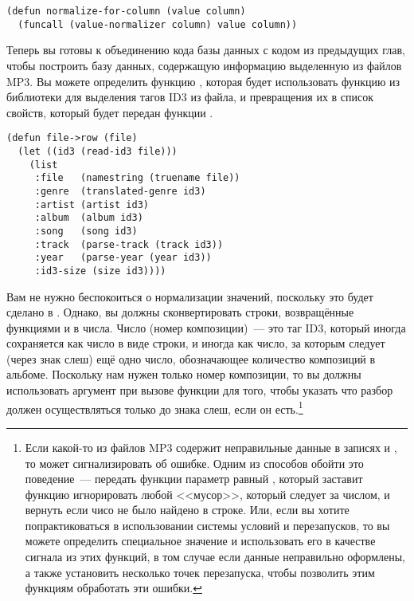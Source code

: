 \begin{lstlisting}
(defun normalize-for-column (value column)
  (funcall (value-normalizer column) value column))
\end{lstlisting}

Теперь вы готовы к объединению кода базы данных с кодом из предыдущих глав, чтобы
построить базу данных, содержащую информацию выделенную из файлов MP3.  Вы можете
определить функцию , которая будет использовать функцию  из
библиотеки  для выделения тагов ID3 из файла, и превращения их в список
свойств, который будет передан функции .

\begin{lstlisting}
(defun file->row (file)
  (let ((id3 (read-id3 file)))
    (list
     :file   (namestring (truename file))
     :genre  (translated-genre id3)
     :artist (artist id3)
     :album  (album id3)
     :song   (song id3)
     :track  (parse-track (track id3))
     :year   (parse-year (year id3))
     :id3-size (size id3))))
\end{lstlisting}

Вам не нужно беспокоиться о нормализации значений, поскольку это будет сделано в
.  Однако, вы должны сконвертировать строки, возвращённые функциями
 и  в числа.  Число  (номер композиции)~--- это таг ID3,
который иногда сохраняется как число в виде строки, и иногда как число, за которым следует
(через знак слеш) ещё одно число, обозначающее количество композиций в альбоме.  Поскольку
нам нужен только номер композиции, то вы должны использовать аргумент  при
вызове функции  для того, чтобы указать что разбор должен
осуществляться только до знака слеш, если он есть.\footnote{Если какой-то из файлов MP3
  содержит неправильные данные в записях  и , то
   может сигнализировать об ошибке. Одним из способов обойти это
  поведение~--- передать функции  параметр  равный
  , который заставит функцию игнорировать любой <<мусор>>, который следует за
  числом, и вернуть  если чисо не было найдено в строке.  Или, если вы хотите
  попрактиковаться в использовании системы условий и перезапусков, то вы можете определить
  специальное значение  и использовать его в качестве сигнала из этих функций,
  в том случае если данные неправильно оформлены, а также установить несколько точек
  перезапуска, чтобы позволить этим функциям обработать эти ошибки.}

